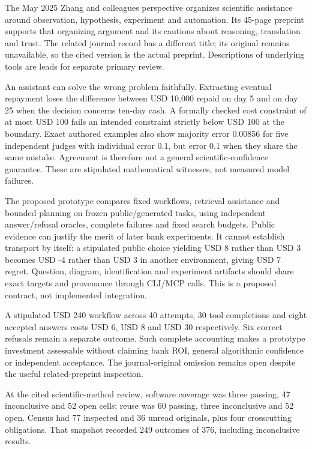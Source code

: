 The May 2025 Zhang and colleagues perspective organizes scientific
assistance around observation, hypothesis, experiment and automation.
Its 45-page preprint supports that organizing argument and its cautions
about reasoning, translation and trust. The related journal record has a
different title; its original remains unavailable, so the cited version
is the actual preprint. Descriptions of underlying tools are leads for
separate primary review. \citep{exec24_scimethod_original}

An assistant can solve the wrong problem faithfully. Extracting eventual
repayment loses the difference between USD 10,000 repaid on day 5 and on
day 25 when the decision concerns ten-day cash. A formally checked cost
constraint of at most USD 100 fails an intended constraint strictly
below USD 100 at the boundary. Exact authored examples also show
majority error 0.00856 for five independent judges with individual error
0.1, but error 0.1 when they share the same mistake. Agreement is
therefore not a general scientific-confidence guarantee. These are
stipulated mathematical witnesses, not measured model failures.
\citep{exec24_scimethod_reference}

The proposed prototype compares fixed workflows, retrieval assistance
and bounded planning on frozen public/generated tasks, using independent
answer/refusal oracles, complete failures and fixed search budgets.
Public evidence can justify the merit of later bank experiments. It
cannot establish transport by itself: a stipulated public choice
yielding USD 8 rather than USD 3 becomes USD -4 rather than USD 3 in
another environment, giving USD 7 regret. Question, diagram,
identification and experiment artifacts should share exact targets and
provenance through CLI/MCP calls. This is a proposed contract, not
implemented integration.
\citep{exec24_scimethod_original,exec24_scimethod_reference}

A stipulated USD 240 workflow across 40 attempts, 30 tool completions
and eight accepted answers costs USD 6, USD 8 and USD 30 respectively.
Six correct refusals remain a separate outcome. Such complete accounting
makes a prototype investment assessable without claiming bank ROI,
general algorithmic confidence or independent acceptance. The
journal-original omission remains open despite the useful
related-preprint inspection. \citep{exec24_scimethod_reference}

At the cited scientific-method review, software coverage was three
passing, 47 inconclusive and 52 open cells; reuse was 60 passing, three
inconclusive and 52 open. Census had 77 inspected and 36 unread
originals, plus four crosscutting obligations. That snapshot recorded
249 outcomes of 376, including inconclusive results.
\citep{sp24scimethod_reader,sp24scimethod_progress}

